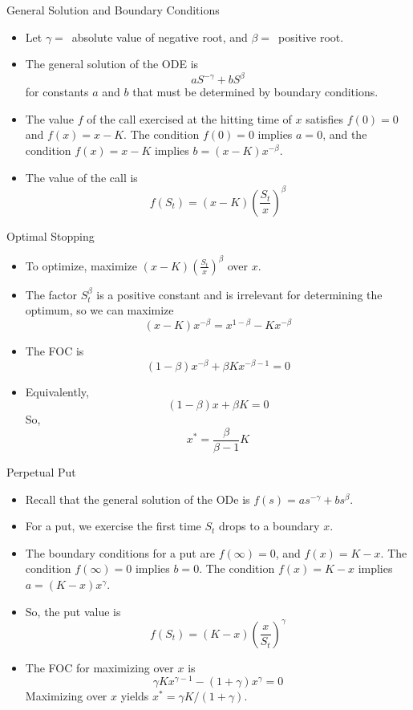 \documentclass[10pt]{beamer}
\newcommand{\bi}{\begin{itemize}}
\newcommand{\ei}{\end{itemize}}
\newcommand{\im}{\item}
\begin{document}
 \begin{frame}{General Solution and Boundary Conditions}
 \bi \im 
 Let $\gamma=\,$ absolute value of negative root, and $\beta=\,$ positive root.  
 \im The general solution of the ODE is
 $$aS^{-\gamma} + bS^\beta$$
 for constants $a$ and $b$ that must be determined by boundary conditions.
 
 \im The value $f$ of the call exercised at the hitting time of $x$ satisfies $f(0)=0$ and $f(x) = x-K$.  The condition $f(0)=0$ implies $a=0$, and the condition $f(x)=x-K$ implies $b=(x-K)x^{-\beta}$.  
 
 \im The value of the call is
 $$f(S_t) = (x-K)\left(\frac{S_t}{x}\right)^\beta$$
  \ei    
 \end{frame}
 
 \begin{frame}{Optimal Stopping}
 \bi \im 
 To optimize, maximize $(x-K)\left(\frac{S_t}{x}\right)^\beta$ over $x$. 
 \im The factor $S_t^\beta$ is a positive constant and is irrelevant for determining the optimum, so we can maximize
 $$(x-K)x^{-\beta} = x^{1-\beta} - Kx^{-\beta}$$
 
 \im The FOC is
 $$(1-\beta)x^{-\beta} + \beta Kx^{-\beta-1}=0$$
 \im Equivalently,
 $$(1-\beta)x + \beta K=0$$
 So, 
 $$x^* = \frac{\beta}{\beta-1}K$$
     \ei 
 \end{frame}
 
 \begin{frame}{Perpetual Put}
 \bi \im
 Recall that the general solution of the ODe is $f(s) = as^{-\gamma} + bs^\beta$.
 
 \im For a put, we exercise the first time $S_t$ drops to a boundary $x$.  
 \im The boundary conditions for a put are $f(\infty)=0$, and $f(x)=K-x$.  The condition $f(\infty)=0$ implies $b=0$.  The condition $f(x)=K-x$ implies $a=(K-x)x^{\gamma}$.
 
 \im So, the put value is 
 $$f(S_t) = (K-x)\left(\frac{x}{S_t}\right)^\gamma$$
 \im The FOC for maximizing over $x$ is
 $$\gamma K x^{\gamma-1} - (1+\gamma)x^\gamma =0$$
 Maximizing over $x$ yields $x^*=\gamma K/(1+\gamma)$.
 \ei
     
 \end{frame}
 
\end{document}
